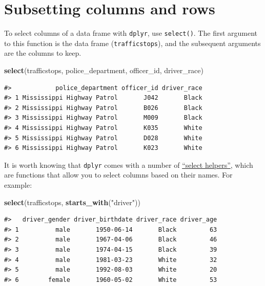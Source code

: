 \documentclass[]{book}
\newenvironment{Shaded}{\begin{snugshade}}{\end{snugshade}}
\newcommand{\KeywordTok}[1]{\textcolor[rgb]{0.13,0.29,0.53}{\textbf{#1}}}
\newcommand{\NormalTok}[1]{#1}
\newcommand{\StringTok}[1]{\textcolor[rgb]{0.31,0.60,0.02}{#1}}
\begin{document}
\hypertarget{subsetting-columns-and-rows}{%
\section{Subsetting columns and rows}\label{subsetting-columns-and-rows}}

To select columns of a
data frame with \texttt{dplyr}, use \texttt{select()}. The first argument to this function is the data
frame (\texttt{trafficstops}), and the subsequent arguments are the columns to keep.

\begin{Shaded}
\begin{Highlighting}[]
\KeywordTok{select}\NormalTok{(trafficstops, police_department, officer_id, driver_race)}
\end{Highlighting}
\end{Shaded}

\begin{verbatim}
#>            police_department officer_id driver_race
#> 1 Mississippi Highway Patrol       J042       Black
#> 2 Mississippi Highway Patrol       B026       Black
#> 3 Mississippi Highway Patrol       M009       Black
#> 4 Mississippi Highway Patrol       K035       White
#> 5 Mississippi Highway Patrol       D028       White
#> 6 Mississippi Highway Patrol       K023       White
\end{verbatim}

It is worth knowing that \texttt{dplyr} comes with a number of \href{https://www.rdocumentation.org/packages/dplyr/versions/0.7.2/topics/select_helpers}{``select helpers''}, which are functions that allow you to select columns based on their names. For example:

\begin{Shaded}
\begin{Highlighting}[]
\KeywordTok{select}\NormalTok{(trafficstops, }\KeywordTok{starts_with}\NormalTok{(}\StringTok{"driver"}\NormalTok{))}
\end{Highlighting}
\end{Shaded}

\begin{verbatim}
#>   driver_gender driver_birthdate driver_race driver_age
#> 1          male       1950-06-14       Black         63
#> 2          male       1967-04-06       Black         46
#> 3          male       1974-04-15       Black         39
#> 4          male       1981-03-23       White         32
#> 5          male       1992-08-03       White         20
#> 6        female       1960-05-02       White         53
\end{verbatim}
\end{document}
